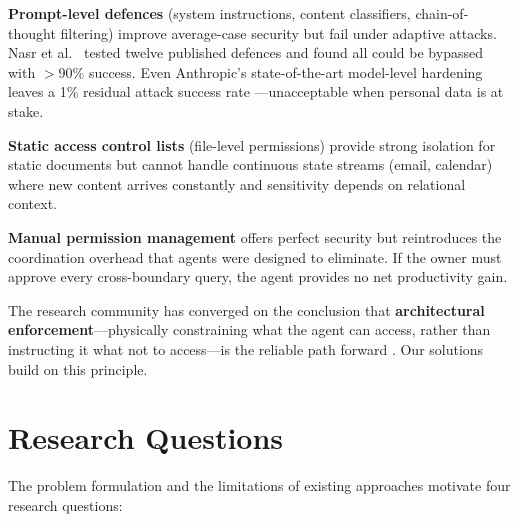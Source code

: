 \textbf{Prompt-level defences} (system instructions, content classifiers, chain-of-thought filtering) improve average-case security but fail under adaptive attacks. Nasr et al.\ \cite{nasr2025attacker} tested twelve published defences and found all could be bypassed with $>$90\% success. Even Anthropic's state-of-the-art model-level hardening leaves a 1\% residual attack success rate \cite{anthropic2025promptinjection}---unacceptable when personal data is at stake.

\textbf{Static access control lists} (file-level permissions) provide strong isolation for static documents but cannot handle continuous state streams (email, calendar) where new content arrives constantly and sensitivity depends on relational context.

\textbf{Manual permission management} offers perfect security but reintroduces the coordination overhead that agents were designed to eliminate. If the owner must approve every cross-boundary query, the agent provides no net productivity gain.

The research community has converged on the conclusion that \textbf{architectural enforcement}---physically constraining what the agent can access, rather than instructing it what not to access---is the reliable path forward \cite{google2025promptinjection, meta2025ruletwo}. Our solutions build on this principle.

\section{Research Questions}
\label{sec:research_questions}

The problem formulation and the limitations of existing approaches motivate four research questions:

